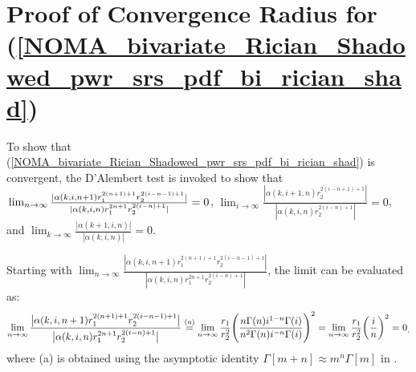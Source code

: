 \section{Proof of Convergence Radius for (\ref{NOMA_bivariate_Rician_Shadowed_pwr_srs_pdf_bi_rician_shad})} \label{NOMA_bivariate_Rician_Shadowed_pdf_corollary_convergence_proof}
To show that (\ref{NOMA_bivariate_Rician_Shadowed_pwr_srs_pdf_bi_rician_shad}) is convergent, the D'Alembert test is invoked to show that $\\ \lim_{n \to \infty} \frac{|\alpha(k,i,n+1) r_1^{2(n+1)+1} r_2^{2(i-n-1)+1}|}{|\alpha(k,i,n) r_1^{2n+1} r_2^{2(i-n)+1}|} = 0$, $\lim_{i \to \infty} \frac{|\alpha(k,i+1,n) r_2^{2(i-n+1)+1}|}{|\alpha(k,i,n) r_2^{2(i-n)+1}|} = 0$, and $\lim_{k \to \infty} \frac{|\alpha(k+1,i,n)|}{|\alpha(k,i,n)|} = 0$.

Starting with $\lim_{n \to \infty} \frac{|\alpha(k,i,n+1) r_1^{2(n+1)+1} r_2^{2(i-n-1)+1}|}{|\alpha(k,i,n) r_1^{2n+1} r_2^{2(i-n)+1}|}$, the limit can be evaluated as:
\begin{eqnarray}
 \lim_{n \to \infty} \frac{\big|\alpha(k,i,n+1) r_1^{2(n+1)+1} r_2^{2(i-n-1)+1}\big|}{\big|\alpha(k,i,n) r_1^{2n+1} r_2^{2(i-n)+1}\big|} \stackrel{(a)}{=} \lim_{n \to \infty} \frac{r_1}{r_2^2} \Bigg(\frac{n\Gamma(n)i^{1-n}\Gamma(i)}{n^2\Gamma(n)i^{-n}\Gamma(i)}\Bigg)^2  = \lim_{n \to \infty} \frac{r_1}{r_2^2} \bigg(\frac{i}{n}\bigg)^2 = 0_, \label{NOMA_bivariate_Rician_Shadowed_pdf_corollary_convergence_proof_eq1}
\end{eqnarray}
where (a) is obtained using the asymptotic identity $\Gamma[m+n] \approx m^n\Gamma[m]$ in \cite[eq. (25)]{rached2017unified}.

